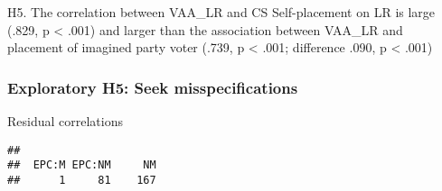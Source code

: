 \documentclass[
]{article}
\newenvironment{Shaded}{\begin{snugshade}}{\end{snugshade}}
\newcommand{\CommentTok}[1]{\textcolor[rgb]{0.56,0.35,0.01}{\textit{#1}}}
\newcommand{\DataTypeTok}[1]{\textcolor[rgb]{0.13,0.29,0.53}{#1}}
\newcommand{\DecValTok}[1]{\textcolor[rgb]{0.00,0.00,0.81}{#1}}
\newcommand{\KeywordTok}[1]{\textcolor[rgb]{0.13,0.29,0.53}{\textbf{#1}}}
\newcommand{\NormalTok}[1]{#1}
\newcommand{\OperatorTok}[1]{\textcolor[rgb]{0.81,0.36,0.00}{\textbf{#1}}}
\newcommand{\StringTok}[1]{\textcolor[rgb]{0.31,0.60,0.02}{#1}}
\begin{document}
H5. The correlation between VAA\_LR and CS Self-placement on LR is large
(.829, p \textless{} .001) and larger than the association between
VAA\_LR and placement of imagined party voter (.739, p \textless{} .001;
difference .090, p \textless{} .001)

\hypertarget{exploratory-h5-seek-misspecifications}{%
\subsubsection{Exploratory H5: Seek
misspecifications}\label{exploratory-h5-seek-misspecifications}}

Residual correlations

\begin{Shaded}
\end{Shaded}

\begin{verbatim}
## 
##  EPC:M EPC:NM     NM 
##      1     81    167
\end{verbatim}
\end{document}
